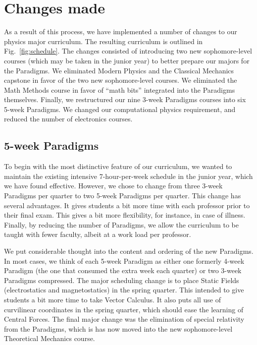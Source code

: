 \documentclass[english,aps,pra,reprint,noshowpacs,superscriptaddress]{revtex4-1}
\begin{document}
\section{Changes made}
As a result of this process, we have implemented a number of changes
to our physics major curriculum.  The resulting curriculum is outlined
in Fig.~\ref{fig:schedule}.  The changes consisted of introducing two
new sophomore-level courses (which may be taken in the junior year) to
better prepare our majors for the Paradigms.  We eliminated Modern
Physics and the Classical Mechanics capstone in favor of the two new
sophomore-level courses.  We eliminated the Math Methods course in
favor of ``math bits'' integrated into the Paradigms themselves.
Finally, we restructured our nine 3-week Paradigms courses into six
5-week Paradigms.  We changed our computational physics requirement,
and reduced the number of electronics courses.

\subsection{5-week Paradigms}
To begin with the most distinctive feature of our curriculum, we
wanted to maintain the existing intensive 7-hour-per-week schedule in
the junior year, which we have found effective.  However, we chose to
change from three 3-week Paradigms per quarter to two 5-week Paradigms
per quarter.    This change has several advantages.  It gives students
a bit more time with each professor prior to their final exam.  This
gives a bit more flexibility, for instance, in case of illness.
Finally, by reducing the number of Paradigms, we allow the curriculum
to be taught with fewer faculty, albeit at a work load per professor.

We put considerable thought into the content and ordering of the new
Paradigms.  In most cases, we think of each 5-week Paradigm as either
one formerly 4-week Paradigm (the one that consumed the extra week
each quarter) or two 3-week Paradigms compressed.  The major
scheduling change is to place Static Fields (electrostatics and
magnetostatics) in the spring quarter.  This intended to give students
a bit more time to take Vector Calculus.  It also puts all use of
curvilinear coordinates in the spring quarter, which should ease the
learning of Central Forces.  The final major change was the
elimination of special relativity from the Paradigms, which is has now
moved into the new sophomore-level Theoretical Mechanics course.
\end{document}
